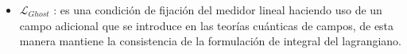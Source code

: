 \begin{itemize}

\item $\mathcal{L}_{Ghost}$ : %
es una condición de fijación del medidor lineal haciendo uso de un campo adicional que se introduce en las teorías cuánticas de campos, de esta manera mantiene la consistencia de la formulación de integral del lagrangiano.%
%
\end{itemize}


